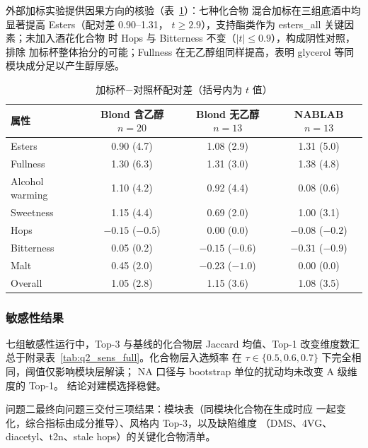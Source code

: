 \documentclass[12pt,a4paper]{article}
\begin{document}

外部加标实验提供因果方向的核验（表~\ref{tab:spike}）：七种化合物
混合加标在三组底酒中均显著提高 Esters（配对差 0.90--1.31，
$t\ge2.9$），支持酯类作为 esters\_all 关键因素；未加入酒花化合物
时 Hops 与 Bitterness 不变（$|t|\le0.9$），构成阴性对照，排除
加标杯整体抬分的可能；Fullness 在无乙醇组同样提高，表明 glycerol
等同模块成分足以产生醇厚感。

\begin{table}[!htbp]
  \centering\small
  \caption{加标杯$-$对照杯配对差（括号内为 $t$ 值）}
  \label{tab:spike}
  \begin{tabular}{lccc}
    \toprule
    属性 & Blond 含乙醇 $n{=}20$ & Blond 无乙醇 $n{=}13$ & NABLAB $n{=}13$ \\
    \midrule
    Esters & 0.90 (4.7) & 1.08 (2.9) & 1.31 (5.0) \\
    Fullness & 1.30 (6.3) & 1.31 (3.0) & 1.38 (4.8) \\
    Alcohol warming & 1.10 (4.2) & 0.92 (4.4) & 0.08 (0.6) \\
    Sweetness & 1.15 (4.4) & 0.69 (2.0) & 1.00 (3.1) \\
    Hops & $-0.15$ ($-0.5$) & 0.00 (0.0) & $-0.08$ ($-0.2$) \\
    Bitterness & 0.05 (0.2) & $-0.15$ ($-0.6$) & $-0.31$ ($-0.9$) \\
    Malt & 0.45 (2.0) & $-0.23$ ($-1.0$) & 0.00 (0.0) \\
    Overall & 1.05 (2.8) & 1.15 (3.6) & 1.08 (3.5) \\
    \bottomrule
  \end{tabular}
\end{table}

\subsubsection{敏感性结果}

七组敏感性运行中，Top-3 与基线的化合物层 Jaccard 均值、Top-1
改变维度数汇总于附录表~\ref{tab:q2_sens_full}。化合物层入选频率
在 $\tau\in\{0.5,0.6,0.7\}$ 下完全相同，阈值仅影响模块层解读；
NA 口径与 bootstrap 单位的扰动均未改变 A 级维度的 Top-1。
结论对建模选择稳健。

问题二最终向问题三交付三项结果：模块表（同模块化合物在生成时应
一起变化，综合指标由成分推导）、风格内 Top-3，以及缺陷维度
（DMS、4VG、diacetyl、t2n、stale hops）的关键化合物清单。
\end{document}
